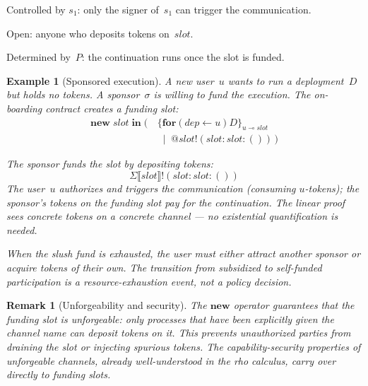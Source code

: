 \documentclass[11pt,a4paper]{article}
\makeatletter
\newtheorem{remark}[theorem]{Remark}
\newtheorem{example}[theorem]{Example}
\newcommand{\lsem}{\llbracket}
\newcommand{\rsem}{\rrbracket}
\newcommand{\Par}{\mathbin{|}}
\newcommand{\forc}{\mathbf{for}}
\newcommand{\send}[2]{#1 !\!\left( #2 \right)}
\newcommand{\recv}[3]{\forc\!\left( #1 \leftarrow #2 \right) #3}
\newcommand{\quot}[1]{@#1}
\newcommand{\signed}[2]{\{#1\}_{#2}}
\makeatother
\begin{document}
\begin{description}[style=nextline, leftmargin=2em, nosep]
  \item[Authorization (who may initiate).]
    Controlled by $s_1$: only the signer of~$s_1$ can
    trigger the communication.
  \item[Funding (who pays for the continuation).]
    Open: anyone who deposits tokens on~$\mathit{slot}$.
  \item[Execution (what happens).]
    Determined by~$P$: the continuation runs once the
    slot is funded.
\end{description}

\begin{example}[Sponsored execution]
  \label{ex:sponsored}
  A new user~$u$ wants to run a deployment~$D$ but holds no
  tokens.  A sponsor~$\sigma$ is willing to fund the
  execution.  The on-boarding contract creates a funding slot:
  \begin{align*}
    \mathbf{new}\;\mathit{slot}\;\mathbf{in}\;
    \bigl(\,
      &\signed{\recv{\mathit{dep}}{u}{D}}
        {u \multimap \mathit{slot}}
      \\[-2pt]
      &\;\Par\;
      \send{\quot{\mathit{slot}}}
        {\mathit{slot} : \mathit{slot} : ()}
    \,\bigr)
  \end{align*}

  \noindent
  The sponsor funds the slot by depositing tokens:
  \[
    \send{\Sigma\lsem\mathit{slot}\rsem}{
      \mathit{slot} : \mathit{slot} : ()
    }
  \]
  The user~$u$ authorizes and triggers the communication
  (consuming $u$-tokens); the sponsor's tokens on the
  funding slot pay for the continuation.  The linear proof
  sees concrete tokens on a concrete channel --- no
  existential quantification is needed.

  When the slush fund is exhausted, the user must either
  attract another sponsor or acquire tokens of their own.
  The transition from subsidized to self-funded participation
  is a resource-exhaustion event, not a policy decision.
\end{example}

\begin{remark}[Unforgeability and security]
  The $\mathbf{new}$ operator guarantees that the funding
  slot is \emph{unforgeable}: only processes that have been
  explicitly given the channel name can deposit tokens on it.
  This prevents unauthorized parties from draining the slot
  or injecting spurious tokens.  The capability-security
  properties of unforgeable channels, already well-understood
  in the rho calculus, carry over directly to funding slots.
\end{remark}
\end{document}
